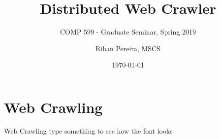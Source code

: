 \documentclass[9pt]{beamer}
\title{Distributed Web Crawler}
\subtitle{COMP 599 - Graduate Seminar, Spring 2019}
\author{Rihan Pereira, MSCS}
\institute[California State University, Channel Islands]
{
  Department of Computer Science\\
  California State University, Channel Islands
}
\date{\today}
\begin{document}
\begin{frame}[plain]
  \frametitle{}
  \titlepage
\end{frame}



%


\section{Web Crawling}
\begin{frame}{Web Crawling}
  type something to see how the font looks
\end{frame}
\end{document}
